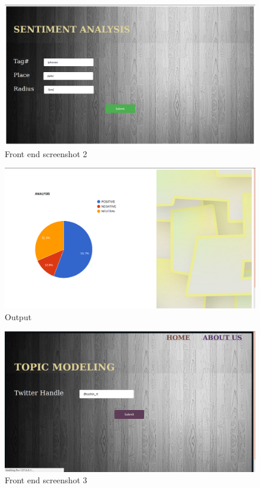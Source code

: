 \begin{figure}[h]
	\centering
	\includegraphics[width=0.9\linewidth]{image2.png}
	\caption{Front end screenshot 2}
	\label{fig:expression01}
\end{figure}

\begin{figure}
	\centering
	\includegraphics[width=0.8\linewidth]{new_out_sent.png}
	\caption{Output}
	\label{types}
\end{figure}

\begin{figure}[h]
	\centering
	\includegraphics[width=0.9\linewidth]{sachin_topic.png}
	\caption{Front end screenshot 3}
	\label{fig:expression01}
\end{figure}

